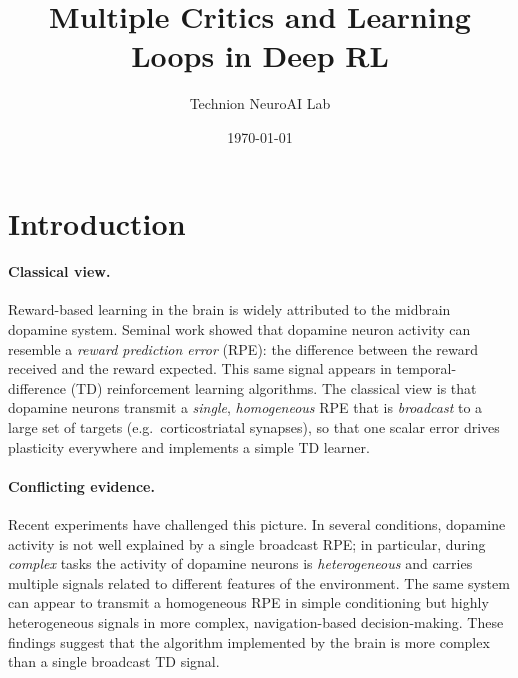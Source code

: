 \documentclass[11pt]{article}
\title{Multiple Critics and Learning Loops in Deep RL}
\author{Technion NeuroAI Lab}
\date{\today}
\begin{document}
\maketitle

\section{Introduction}

\paragraph{Classical view.} Reward-based learning in the brain is widely attributed to the midbrain dopamine system. Seminal work showed that dopamine neuron activity can resemble a \emph{reward prediction error} (RPE): the difference between the reward received and the reward expected. This same signal appears in temporal-difference (TD) reinforcement learning algorithms. The classical view is that dopamine neurons transmit a \emph{single}, \emph{homogeneous} RPE that is \emph{broadcast} to a large set of targets (e.g.\ corticostriatal synapses), so that one scalar error drives plasticity everywhere and implements a simple TD learner.

\paragraph{Conflicting evidence.} Recent experiments have challenged this picture. In several conditions, dopamine activity is not well explained by a single broadcast RPE; in particular, during \emph{complex} tasks the activity of dopamine neurons is \emph{heterogeneous} and carries multiple signals related to different features of the environment. The same system can appear to transmit a homogeneous RPE in simple conditioning but highly heterogeneous signals in more complex, navigation-based decision-making. These findings suggest that the algorithm implemented by the brain is more complex than a single broadcast TD signal.
\end{document}
